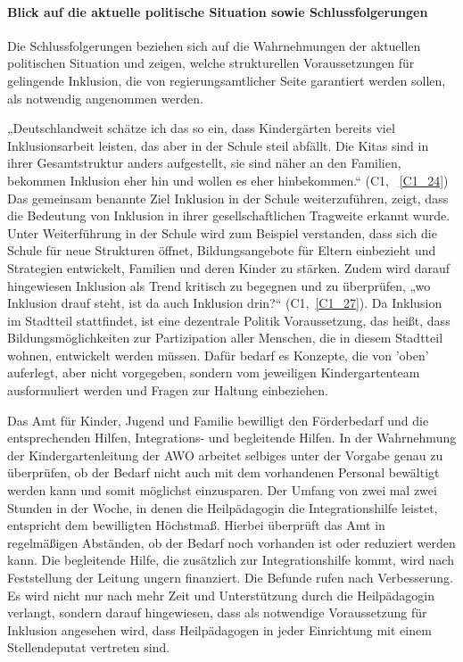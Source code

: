 \paragraph{Blick auf die aktuelle politische Situation sowie Schlussfolgerungen}

Die Schlussfolgerungen beziehen sich auf die Wahrnehmungen der aktuellen politischen Situation und zeigen, welche strukturellen Voraussetzungen für gelingende Inklusion, die von regierungsamtlicher Seite garantiert werden sollen, als notwendig angenommen werden.
 
„Deutschlandweit schätze ich das so ein, dass Kindergärten bereits viel Inklusionsarbeit leisten, das aber in der Schule steil abfällt. Die Kitas sind in ihrer Gesamtstruktur anders aufgestellt, sie sind näher an den Familien, bekommen Inklusion eher hin und wollen es eher hinbekommen.“ (C1, ~\ref{C1_24}) Das gemeinsam benannte Ziel Inklusion in der Schule weiterzuführen, zeigt, dass die Bedeutung von Inklusion in ihrer gesellschaftlichen Tragweite erkannt wurde. Unter Weiterführung in der Schule wird zum Beispiel verstanden, dass sich die Schule für neue Strukturen öffnet, Bildungsangebote für Eltern einbezieht und Strategien entwickelt, Familien und deren Kinder zu stärken. Zudem wird darauf hingewiesen Inklusion als Trend kritisch zu begegnen und zu überprüfen, „wo Inklusion drauf steht, ist da auch Inklusion drin?“ (C1,~\ref{C1_27}). 
Da Inklusion im Stadtteil stattfindet, ist eine dezentrale Politik Voraussetzung, das heißt, dass Bildungsmöglichkeiten zur Partizipation aller Menschen, die in diesem Stadtteil wohnen, entwickelt werden müssen. Dafür bedarf es Konzepte, die von 'oben' auferlegt, aber nicht vorgegeben, sondern vom jeweiligen Kindergartenteam ausformuliert werden und Fragen zur Haltung einbeziehen.

Das Amt für Kinder, Jugend und Familie bewilligt den Förderbedarf und die entsprechenden Hilfen, Integrations- und begleitende Hilfen. In der Wahrnehmung der Kindergartenleitung der AWO arbeitet selbiges unter der Vorgabe genau zu überprüfen, ob der Bedarf nicht auch mit dem vorhandenen Personal bewältigt werden kann und somit möglichst ein\-zusparen. Der Umfang von zwei mal zwei Stunden in der Woche, in denen die Heilpädagogin die Integrationshilfe leistet, entspricht dem  bewilligten Höchstmaß. Hierbei überprüft das Amt in regelmäßigen Abständen, ob der Bedarf noch vorhanden ist oder reduziert werden kann. Die begleitende Hilfe, die zusätzlich zur Integrationshilfe kommt, wird nach Feststellung der Leitung ungern finanziert. Die Befunde rufen nach Verbesserung. Es wird nicht nur nach mehr Zeit und Unterstützung durch die Heilpädagogin verlangt, sondern darauf hingewiesen, dass als notwendige Voraussetzung für Inklusion angesehen wird, dass Heilpädagogen in jeder Einrichtung mit einem Stellendeputat vertreten sind. 

